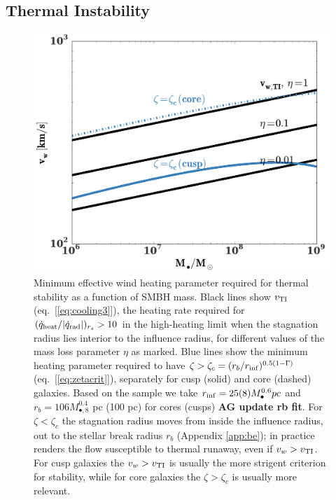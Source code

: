 \documentclass[usenatbib,fleqn]{mn2e}
\newcommand{\rb}{r_b}
\newcommand{\Mbh}[1][]{M_{\bullet#1}}
\newcommand{\Mbheight}{M_{\bullet,8}}
\newcommand{\rinf}{r_{\rm inf}}
\begin{document}
\subsection{Thermal Instability}
\label{sec:instability}


\begin{figure}
  \includegraphics[width=\columnwidth]{ti.pdf}
  \caption{Minimum effective wind heating parameter required for
    thermal stability as a function of SMBH mass.  Black lines show
    $v_{\rm TI}$ (eq.~[\ref{eq:cooling3}]), the heating rate required
    for $(\dot{q}_{\rm heat}/|\dot{q}_{\rm rad}|)_{r_{s}} > 10$ in the
    high-heating limit when the stagnation radius lies interior to the
    influence radius, for different values of the mass loss parameter
    $\eta$ as marked.  Blue lines show the minimum heating parameter
    required to have $\zeta > \zeta_c = (r_{b}/r_{\rm
      inf})^{0.5(1-\Gamma)}$ (eq.~[\ref{eq:zetacrit}]), separately for
    cusp (solid) and core (dashed) galaxies. Based on the
    \citet{LauerFaber+:2007a} sample we take $\rinf=25 (8) \Mbh^{0.6}
    pc$ and $\rb=106 \Mbheight^{0.4}$ pc (100 pc)  for cores (cusps)
    {\bf AG update rb fit}. For
    $\zeta < \zeta_c$ the stagnation radius moves from inside the
    influence radius, out to the stellar break radius $r_b$ (Appendix
    \ref{app:be}); in practice renders the flow susceptible to thermal
    runaway, even if $v_{w} > v_{\rm TI}$.  For cusp galaxies the $v_w
    > v_{\rm TI}$ is usually the more strigent criterion for
    stability, while for core galaxies the $\zeta > \zeta_c$ is
    usually more relevant.}
\label{fig:TI}
\end{figure}
\end{document}
